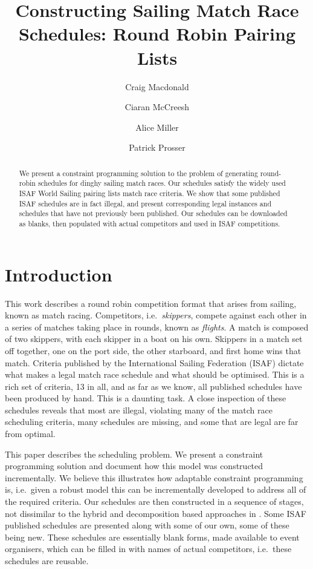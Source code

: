 \documentclass{llncs}
\begin{document}
\title{Constructing Sailing Match Race Schedules: Round Robin Pairing Lists}
\author{Craig Macdonald \and Ciaran McCreesh \and Alice Miller \and Patrick Prosser}
\maketitle

\begin{abstract}
We present a constraint programming solution to the problem of generating round-robin schedules for
dinghy sailing match races. Our schedules satisfy the widely used ISAF World Sailing pairing lists
match race criteria. We show that some published ISAF schedules are in fact illegal, and present
corresponding legal instances and schedules that have not previously been published. Our schedules
can be downloaded as blanks, then populated with actual competitors and used in ISAF competitions.
\end{abstract}

\section{Introduction}

This work describes a round robin competition format that arises from sailing, known as match
racing. Competitors, i.e.\ \emph{skippers}, compete against each other in a series of matches taking
place in rounds, known as \emph{flights}.  A match is composed of two skippers, with each skipper in
a boat on his own. Skippers in a match set off together, one on the port side, the other starboard,
and first home wins that match. Criteria published by the International Sailing Federation (ISAF)
dictate what makes a legal match race schedule and what should be optimised. This is a rich set of
criteria, 13 in all, and as far as we know, all published schedules have been produced by hand. This
is a daunting task. A close inspection of these schedules reveals that most are illegal, violating
many of the match race scheduling criteria, many schedules are missing, and some that are legal are
far from optimal.

This paper describes the scheduling problem. We present a constraint programming solution and
document how this model was constructed incrementally. We believe this illustrates how adaptable
constraint programming is, i.e.\ given a robust model this can be incrementally developed to
address all of the required criteria. Our schedules are then constructed in a sequence of stages,
not dissimilar to the hybrid and decomposition based approaches in \cite{lombardi2012}. Some ISAF
published schedules are presented along with some of our own, some of these being new.  These
schedules are essentially blank forms, made available to event organisers, which can be filled in
with names of actual competitors, i.e.\ these schedules are reusable.
\end{document}
